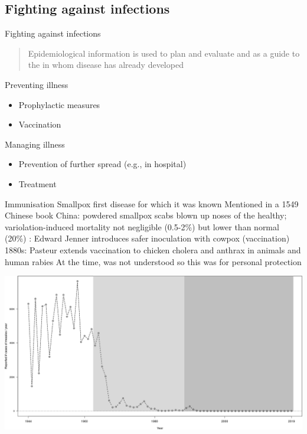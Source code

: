 \documentclass[aspectratio=169]{beamer}\usepackage[]{graphicx}\usepackage[]{xcolor}
\begin{document}
\subsection{Fighting against infections}


\begin{frame}{Fighting against infections}
\begin{quote}
    Epidemiological information is used to plan and evaluate  and as a guide to the  in whom disease has already developed  
\end{quote}
\vfill
\bbullet Preventing illness
\begin{itemize}
    \item Prophylactic measures
    \item Vaccination
\end{itemize}
\vfill
\bbullet Managing illness
\begin{itemize}
    \item Prevention of further spread (e.g., in hospital) 
    \item Treatment
\end{itemize}
\end{frame}


\begin{frame}{Immunisation}
\bbullet Smallpox first disease for which it was known 
\vfill
\bbullet Mentioned in a 1549 Chinese book
\vfill
\bbullet China: powdered smallpox scabs blown up noses of the healthy; variolation-induced mortality not negligible (0.5-2\%) but lower than normal (20\%)
\vfill
{}:  Edward Jenner introduces safer inoculation with cowpox (vaccination)
\vfill
\bbullet 1880s: Pasteur extends vaccination to chicken cholera and anthrax in animals and human rabies
\vfill
At the time,  was not understood so this was for personal protection
\end{frame}


\begin{frame}
\includegraphics[width=\textwidth]{FIGS/measles_US_1944_2019.png}
\end{frame}
\end{document}
